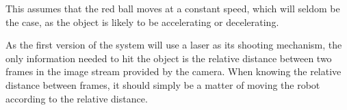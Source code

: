 This assumes that the red ball moves at a constant speed, which will seldom be the case, as the object is likely to be accelerating or decelerating.


As the first version of the system will use a laser as its shooting mechanism, the only information needed to hit the object is the relative distance between two frames in the image stream provided by the camera. 
When knowing the relative distance between frames, it should simply be a matter of moving the robot according to the relative distance.
